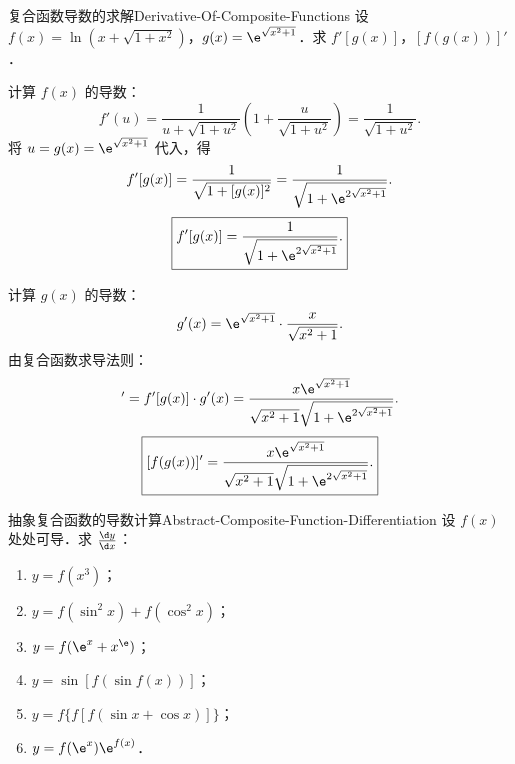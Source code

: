 \begin{problem}{复合函数导数的求解}{Derivative-Of-Composite-Functions}
    设 $f(x) = \ln(x + \sqrt{1+x^2})$，$g(x) = \e^{\sqrt{x^2+1}}$．求 $f'[g(x)]$，$[f(g(x))]'$．
\end{problem}

\begin{solution}
    计算 $f(x)$ 的导数：
    \begin{equation}
        f'(u) = \frac{1}{u + \sqrt{1+u^2}} \left( 1 + \frac{u}{\sqrt{1+u^2}} \right) = \frac{1}{\sqrt{1+u^2}}.
    \end{equation}
    将 $u = g(x) = \e^{\sqrt{x^2+1}}$ 代入，得
    \begin{equation}
        f'[g(x)] = \frac{1}{\sqrt{1 + [g(x)]^2}} = \frac{1}{\sqrt{1 + \e^{2\sqrt{x^2+1}}}}.
    \end{equation}
    \begin{equation}
        \boxed{f'[g(x)] = \frac{1}{\sqrt{1 + \e^{2\sqrt{x^2+1}}}}.}
    \end{equation}

    计算 $g(x)$ 的导数：
    \begin{equation}
        g'(x) = \e^{\sqrt{x^2+1}} \cdot \frac{x}{\sqrt{x^2+1}}.
    \end{equation}
    由复合函数求导法则：
    \begin{equation}
        [f(g(x))]' = f'[g(x)] \cdot g'(x) = \frac{x\e^{\sqrt{x^2+1}}}{\sqrt{x^2+1}\sqrt{1 + \e^{2\sqrt{x^2+1}}}}.
    \end{equation}
    \begin{equation}
        \boxed{[f(g(x))]' = \frac{x\e^{\sqrt{x^2+1}}}{\sqrt{x^2+1}\sqrt{1 + \e^{2\sqrt{x^2+1}}}}.}
    \end{equation}
\end{solution}

\begin{problem}{抽象复合函数的导数计算}{Abstract-Composite-Function-Differentiation}
    设 $f(x)$ 处处可导．求 $\frac{\d y}{\d x}$：
    \begin{enumerate}
        \item $y = f(x^3)$；
        \item $y = f(\sin^2 x) + f(\cos^2 x)$；
        \item $y = f(\e^x + x^{\e})$；
        \item $y = \sin[f(\sin f(x))]$；
        \item $y = f\{f[f(\sin x + \cos x)]\}$；
        \item $y = f(\e^x)\e^{f(x)}$．
    \end{enumerate}
\end{problem}

